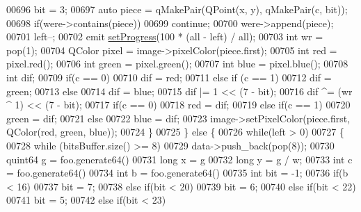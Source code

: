\begin{DoxyCode}
00696                 bit = 3;
00697             \textcolor{keyword}{auto} piece = qMakePair(QPoint(x, y), qMakePair(c, bit));
00698             \textcolor{keywordflow}{if}(were->contains(piece))
00699                 \textcolor{keywordflow}{continue};
00700             were->append(piece);
00701             left--;
00702             emit \hyperlink{class_model_p_c_afdcd80f0ed5062e145a71f09b0897547}{setProgress}(100 * (all - left) / all);
00703             \textcolor{keywordtype}{int} wr = pop(1);
00704             QColor pixel = image->pixelColor(piece.first);
00705             \textcolor{keywordtype}{int} red = pixel.red();
00706             \textcolor{keywordtype}{int} green = pixel.green();
00707             \textcolor{keywordtype}{int} blue = pixel.blue();
00708             \textcolor{keywordtype}{int} dif;
00709             \textcolor{keywordflow}{if}(c == 0)
00710                 dif = red;
00711             \textcolor{keywordflow}{else} \textcolor{keywordflow}{if} (c == 1)
00712                 dif = green;
00713             \textcolor{keywordflow}{else}
00714                 dif = blue;
00715             dif |= 1 << (7 - bit);
00716             dif ^= (wr ^ 1) << (7 - bit);
00717             \textcolor{keywordflow}{if}(c == 0)
00718                 red = dif;
00719             \textcolor{keywordflow}{else} \textcolor{keywordflow}{if}(c == 1)
00720                 green = dif;
00721             \textcolor{keywordflow}{else}
00722                 blue = dif;
00723             image->setPixelColor(piece.first, QColor(red, green, blue));
00724         \}
00725     \} \textcolor{keywordflow}{else} \{
00726         \textcolor{keywordflow}{while}(left > 0)
00727         \{
00728             \textcolor{keywordflow}{while} (bitsBuffer.size() >= 8)
00729                 data->push\_back(pop(8));
00730             quint64 g = foo.generate64() %
00731             \textcolor{keywordtype}{long} x = g %
00732             \textcolor{keywordtype}{long} y = g / w;
00733             \textcolor{keywordtype}{int} c = foo.generate64() %
00734             \textcolor{keywordtype}{int} b = foo.generate64() %
00735             \textcolor{keywordtype}{int} bit = -1;
00736             \textcolor{keywordflow}{if}(b < 16)
00737                 bit = 7;
00738             \textcolor{keywordflow}{else} \textcolor{keywordflow}{if}(bit < 20)
00739                 bit = 6;
00740             \textcolor{keywordflow}{else} \textcolor{keywordflow}{if}(bit < 22)
00741                 bit = 5;
00742             \textcolor{keywordflow}{else} \textcolor{keywordflow}{if}(bit < 23)

\end{DoxyCode}
